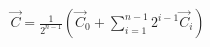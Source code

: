 \documentclass[preview]{standalone}
\begin{document}
\begin{align*}
\vec{C} = \frac{1}{2^{n - 1}}\left(\vec{C}_0 + \sum_{i=1}^{n-1} 2^{i-1}\vec{C}_i \right)
\end{align*}
\end{document}
